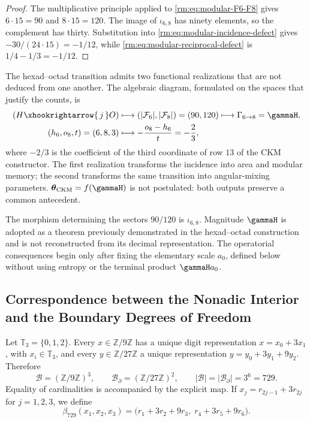 \begin{proof}
The multiplicative principle applied to
\cref{rm:eq:modular-F6-F8} gives \(6\cdot15=90\) and \(8\cdot15=120\).
The image of \(\iota_{6,8}\) has ninety elements, so the
complement has thirty. Substitution into
\cref{rm:eq:modular-incidence-defect} gives
\(-30/(24\cdot15)=-1/12\), while
\cref{rm:eq:modular-reciprocal-defect} is
\(1/4-1/3=-1/12\).
\end{proof}

The hexad--octad transition admits two functional realizations that
are not deduced from one another. The algebraic diagram, formulated on the spaces
that justify the counts, is
\begin{equation}
\label{rm:eq:modular-68-two-readers}
\begin{aligned}
(H\xhookrightarrow{\,j\,}O)
&\longmapsto
\left(|\mathcal F_6|,|\mathcal F_8|\right)=(90,120)
\longmapsto\Gamma_{6\to8}=\gammaH,\\
(h_6,o_8,t)=(6,8,3)
&\longmapsto-\frac{o_8-h_6}{t}=-\frac23,
\end{aligned}
\end{equation}
where \(-2/3\) is the coefficient of the third coordinate of row \(13\) of the CKM constructor. The first realization transforms the incidence into area and modular memory; the second transforms the same transition into angular-mixing parameters. \(\boldsymbol\theta_{\rm CKM}=f(\gammaH)\) is not postulated: both outputs preserve a common antecedent.

The morphism determining the sectors \(90/120\) is
\(\iota_{6,8}\). Magnitude \(\gammaH\) is adopted as a theorem previously
demonstrated in the hexad--octad construction and is not reconstructed from
its decimal representation. The
operatorial consequences begin only after fixing the elementary
scale \(a_0\), defined below without using entropy or the
terminal product \(\gammaH a_0\).

\subsection{Correspondence between the Nonadic Interior and the Boundary Degrees of Freedom}

Let \(\mathbb T_3=\{0,1,2\}\). Every \(x\in\mathbb Z/9\mathbb Z\) has
a unique digit representation
\(x=x_0+3x_1\), with \(x_i\in\mathbb T_3\), and every
\(y\in\mathbb Z/27\mathbb Z\) a unique representation
\(y=y_0+3y_1+9y_2\). Therefore
\begin{equation}
\label{rm:eq:modular-bulk-boundary-729}
\mathcal B=(\mathbb Z/9\mathbb Z)^3,
\qquad
\mathcal B_\partial=(\mathbb Z/27\mathbb Z)^2,
\qquad
|\mathcal B|=|\mathcal B_\partial|=3^6=729.
\end{equation}
Equality of cardinalities is accompanied by the explicit
map. If \(x_j=r_{2j-1}+3r_{2j}\) for \(j=1,2,3\), we define
\begin{equation}
\label{rm:eq:modular-beta729}
\beta_{729}(x_1,x_2,x_3)
=\bigl(r_1+3r_2+9r_3,\;r_4+3r_5+9r_6\bigr).
\end{equation}

